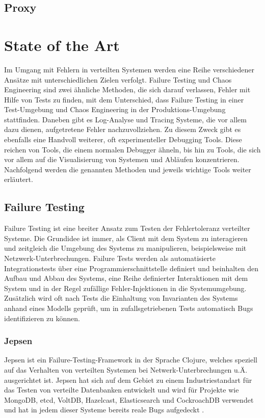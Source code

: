 \documentclass[12pt,a4paper]{report}
\begin{document}
\section{Proxy}

\chapter{State of the Art}
Im Umgang mit Fehlern in verteilten Systemen werden eine Reihe verschiedener Ansätze mit unterschiedlichen Zielen verfolgt.
Failure Testing und Chaos Engineering sind zwei ähnliche Methoden, die sich darauf verlassen, Fehler mit Hilfe von Tests zu
finden, mit dem Unterschied, dass Failure Testing in einer Test-Umgebung und Chaos Engineering in der Produktions-Umgebung
stattfinden. Daneben gibt es Log-Analyse und Tracing Systeme, die vor allem dazu dienen, aufgetretene Fehler nachzuvollziehen. Zu
diesem Zweck gibt es ebenfalls eine Handvoll weiterer, oft experimenteller Debugging Tools. Diese reichen von Tools, die einem
normalen Debugger ähneln, bis hin zu Tools, die sich vor allem auf die Visualisierung von Systemen und Abläufen konzentrieren.
Nachfolgend werden die genannten Methoden und jeweils wichtige Tools weiter erläutert.
\cite{challenges_and_options}

\section{Failure Testing}
Failure Testing ist eine breiter Ansatz zum Testen der Fehlertoleranz verteilter Systeme. Die Grundidee ist immer, als
Client mit dem System zu interagieren und zeitgleich die Umgebung des Systems zu manipulieren, beispielsweise mit
Netzwerk-Unterbrechungen. Failure Tests werden als automatisierte Integrationstests über eine Programmierschnittstelle definiert
und beinhalten den Aufbau und Abbau des Systems, eine Reihe definierter Interaktionen mit dem System und in der Regel zufällige
Fehler-Injektionen in die Systemumgebung. Zusätzlich wird oft nach Tests die Einhaltung von Invarianten des Systems anhand eines
Modells geprüft, um in zufallsgetriebenen Tests automatisch Bugs identifizieren zu können.

\cite{why_is_random_testing_effective}
\cite{failify_masters_thesis}
\subsection{Jepsen}
Jepsen ist ein Failure-Testing-Framework in der Sprache Clojure, welches speziell auf das Verhalten von verteilten Systemen bei
Netwerk-Unterbrechungen u.Ä. ausgerichtet ist. Jepsen hat sich auf dem Gebiet zu einem Industriestandart für das Testen von
verteilte Datenbanken entwickelt \cite{abstracting_the_geniuses} und wird für Projekte wie MongoDB, etcd, VoltDB, Hazelcast,
Elasticsearch und CockroachDB verwendet und hat in jedem dieser Systeme bereits reale Bugs aufgedeckt \cite{jepsen_analyses}.
\end{document}
